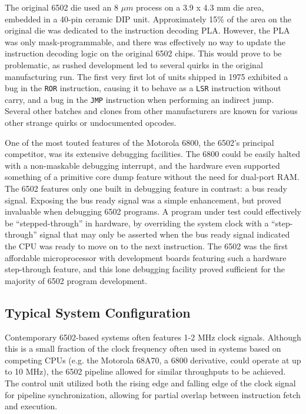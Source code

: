\documentclass[journal]{IEEEtran}
\begin{document}
The original 6502 die used an 8 $\mu m$ process on a 3.9 x 4.3 mm die area,
embedded in a 40-pin ceramic DIP unit. Approximately 15\% of the area on the
original die was dedicated to the instruction decoding PLA. However, the PLA was
only mask-programmable, and there was effectively no way to update the
instruction decoding logic on the original 6502 chips. This would prove to be
problematic, as rushed development led to several quirks in the original
manufacturing run. The first very first lot of units shipped in 1975 exhibited
a bug in the \texttt{ROR} instruction, causing it to behave as a \texttt{LSR}
instruction without carry, and a bug in the \texttt{JMP} instruction when
performing an indirect jump. Several other batches and clones from other
manufacturers are known for various other strange quirks or undocumented
opcodes.

One of the most touted features of the Motorola 6800, the 6502's principal
competitor, was its extensive debugging facilities. The 6800 could be easily
halted with a non-maskable debugging interrupt, and the hardware even supported
something of a primitive core dump feature without the need for dual-port RAM.
The 6502 features only one built in debugging feature in contrast: a bus ready
signal. Exposing the bus ready signal was a simple enhancement, but proved
invaluable when debugging 6502 programs. A program under test could effectively
be ``stepped-through'' in hardware, by overriding the system clock with a
``step-through'' signal that may only be asserted when the bus ready signal
indicated the CPU was ready to move on to the next instruction. The 6502 was the
first affordable microprocessor with development boards featuring such a
hardware step-through feature, and this lone debugging facility proved
sufficient for the majority of 6502 program development.

\subsection{Typical System Configuration}

Contemporary 6502-based systems often features 1-2 MHz clock signals. Although
this is a small fraction of the clock frequency often used in systems based on
competing CPUs (e.g. the Motorola 68A70, a 6800 derivative, could operate at up
to 10 MHz), the 6502 pipeline allowed for similar throughputs to be achieved.
The control unit utilized both the rising edge and falling edge of the clock
signal for pipeline synchronization, allowing for partial overlap between
instruction fetch and execution.
\end{document}
